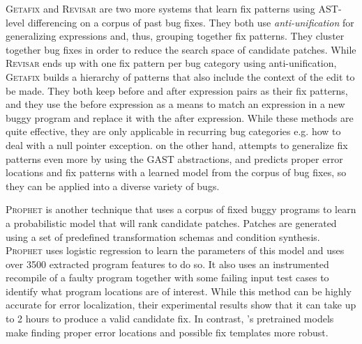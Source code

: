 \textsc{Getafix} \citep{Bader_2019} and \textsc{Revisar} \citep{Rolim_2018} are
two more systems that learn fix patterns using AST-level differencing on a
corpus of past bug fixes. They both use \textit{anti-unification}
\citep{Kutsia_2014} for generalizing expressions and, thus, grouping together
fix patterns. They cluster together bug fixes in order to reduce the search
space of candidate patches. While \textsc{Revisar} \citep{Rolim_2018} ends up
with one fix pattern per bug category using anti-unification, \textsc{Getafix}
\citep{Bader_2019} builds a hierarchy of patterns that also include the context
of the edit to be made. They both keep before and after expression pairs as
their fix patterns, and they use the before expression as a means to match an
expression in a new buggy program and replace it with the after expression.
While these methods are quite effective, they are only applicable in recurring
bug categories e.g. how to deal with a null pointer exception. \toolname on the
other hand, attempts to generalize fix patterns even more by using the GAST
abstractions, and predicts proper error locations and fix patterns with a
learned model from the corpus of bug fixes, so they can be applied into a
diverse variety of bugs.

\textsc{Prophet} \citep{Long_2016} is another technique that uses a corpus of
fixed buggy programs to learn a probabilistic model that will rank candidate
patches. Patches are generated using a set of predefined transformation schemas
and condition synthesis. \textsc{Prophet} uses logistic regression to learn the
parameters of this model and uses over 3500 extracted program features to do so.
It also uses an instrumented recompile of a faulty program together with some
failing input test cases to identify what program locations are of interest.
While this method can be highly accurate for error localization, their
experimental results show that it can take up to 2 hours to produce a valid
candidate fix. In contrast, \toolname's pretrained models make finding proper
error locations and possible fix templates more robust.

